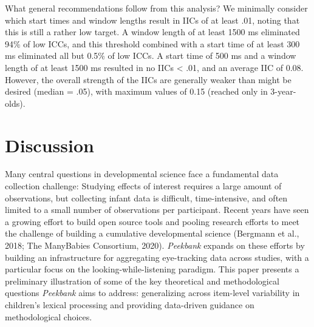 \documentclass[10pt, letterpaper]{article}
\begin{document}
What general recommendations follow from this analysis? We minimally
consider which start times and window lengths result in IICs of at least
.01, noting that this is still a rather low target. A window length of
at least 1500 ms eliminated 94\% of low ICCs, and this threshold
combined with a start time of at least 300 ms eliminated all but 0.5\%
of low ICCs. A start time of 500 ms and a window length of at least 1500
ms resulted in no IICs \textless{} .01, and an average IIC of 0.08.
However, the overall strength of the IICs are generally weaker than
might be desired (median = .05), with maximum values of 0.15 (reached
only in 3-year-olds).

\hypertarget{discussion}{%
\section{Discussion}\label{discussion}}

Many central questions in developmental science face a fundamental data
collection challenge: Studying effects of interest requires a large
amount of observations, but collecting infant data is difficult,
time-intensive, and often limited to a small number of observations per
participant. Recent years have seen a growing effort to build open
source tools and pooling research efforts to meet the challenge of
building a cumulative developmental science (Bergmann et al., 2018; The
ManyBabies Consortium, 2020). \emph{Peekbank} expands on these efforts
by building an infrastructure for aggregating eye-tracking data across
studies, with a particular focus on the looking-while-listening
paradigm. This paper presents a preliminary illustration of some of the
key theoretical and methodological questions \emph{Peekbank} aims to
address: generalizing across item-level variability in children's
lexical processing and providing data-driven guidance on methodological
choices.
\end{document}
